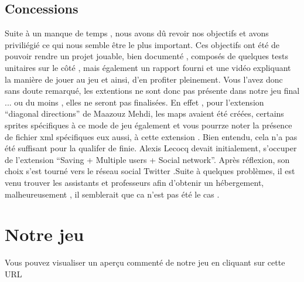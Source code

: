 \documentclass[a4paper,10pt]{article}
\begin{document}
\subsection{Concessions}
Suite à un manque de temps , nous avons dû revoir nos objectifs et avons priviliégié ce qui nous semble être le plus important. 
Ces objectifs ont été de pouvoir rendre un projet jouable, bien documenté , composés de quelques tests unitaires sur le côté , mais 
également un rapport fourni et une vidéo expliquant la manière de jouer au jeu et ainsi, d'en profiter pleinement. 
Vous l'avez donc sans doute remarqué, les extentions ne sont donc pas présente dans notre jeu final ... ou du moins , elles ne seront pas finalisées.
En effet , pour l'extension ``diagonal directions'' de Maazouz Mehdi, les maps avaient été créées, certains sprites spécifiques à ce mode de jeu également
et vous pourrze noter la présence de fichier xml spécifiques eux aussi, à cette extension . Bien entendu, cela n'a pas été suffisant pour la qualifer de finie.
Alexis Lecocq devait initialement, s'occuper de l'extension ``Saving + Multiple users + Social network''. Après réflexion, son choix
s'est tourné vers le réseau social Twitter .Suite à quelques problèmes, il est venu trouver les assistants et professeurs afin d'obtenir un hébergement,
malheureusement , il semblerait que ca n'est pas été le cas .

\section{Notre jeu}
Vous pouvez visualiser un aperçu commenté de notre jeu en cliquant sur cette URL
\end{document}
